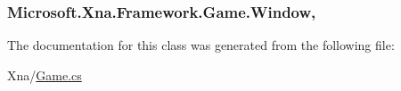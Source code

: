 \subsubsection[{Window}]{ Microsoft.\+Xna.\+Framework.\+Game.\+Window\hspace{0.3cm}{\ttfamily [get]}, {\ttfamily [set]}}\label{class_microsoft_1_1_xna_1_1_framework_1_1_game_a828b73f8290c62c869dd984ef5183b3e}


The documentation for this class was generated from the following file\+:\begin{DoxyCompactItemize}
\item 
Xna/\hyperlink{_game_8cs}{Game.\+cs}\end{DoxyCompactItemize}

